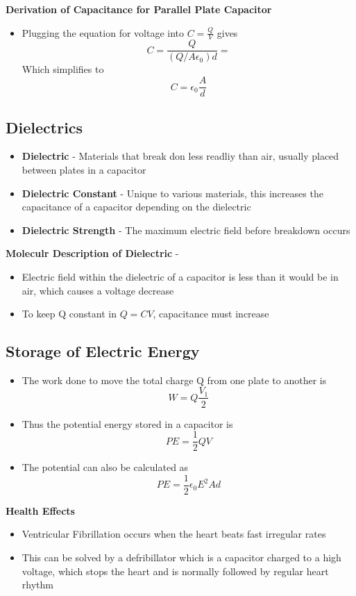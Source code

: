 \textbf{Derivation of Capacitance for Parallel Plate Capacitor}
\begin{itemize}
    \item Plugging the equation for voltage into \(C=\frac{Q}{V}\) gives \[C=\frac{Q}{(Q/A\epsilon_0)d}=\] Which simplifies to \[C=\epsilon_0\frac{A}{d}\]
\end{itemize}

\subsection{Dielectrics}
\begin{itemize}
    \item \textbf{Dielectric} - Materials that break don less readliy than air, usually placed between plates in a capacitor
    \item \textbf{Dielectric Constant} - Unique to various materials, this increases the capacitance of a capacitor depending on the dielectric
    \item \textbf{Dielectric Strength} - The maximum electric field before breakdown occurs
\end{itemize}

\textbf{Moleculr Description of Dielectric} - 
\begin{itemize}
    \item Electric field within the dielectric of a capacitor is less than it would be in air, which causes a voltage decrease
    \item To keep Q constant in \(Q=CV\), capacitance must increase
\end{itemize}

\subsection{Storage of Electric Energy}
\begin{itemize}
    \item The work done to move the total charge Q from one plate to another is \[W=Q\frac{V_1}{2}\]
    \item Thus the potential energy stored in a capacitor is \[PE=\frac{1}{2}QV\]
    \item The potential can also be calculated as \[PE=\frac{1}{2}\epsilon_0E^2Ad\] 
\end{itemize}

\textbf{Health Effects}
\begin{itemize}
    \item Ventricular Fibrillation occurs when the heart beats fast irregular rates
    \item This can be solved by a defribillator which is a capacitor charged to a high voltage, which stops the heart and is normally followed by regular heart rhythm
\end{itemize}

